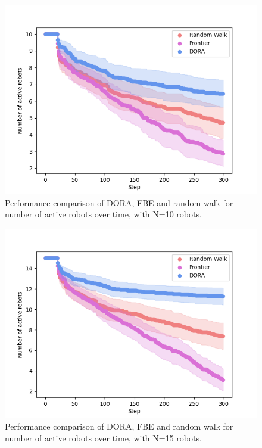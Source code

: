 \begin{figure}[h]
	\centering
    \includegraphics[width=0.99\columnwidth]{images/activerobots_10.png}
    \caption{Performance comparison of DORA, FBE and random walk for number of active robots over time, with N=10 robots.}
    \label{results:failures10}
\end{figure}

\begin{figure}[h]
	\centering
    \includegraphics[width=0.99\columnwidth]{images/activerobots_15.png}
    \caption{Performance comparison of DORA, FBE and random walk for number of active robots over time, with N=15 robots.}
    \label{results:failures15}
\end{figure}

